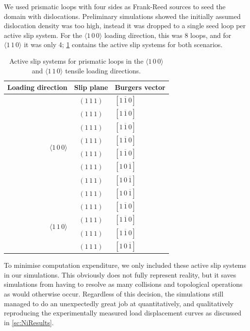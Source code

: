 We used prismatic loops with four sides as Frank-Reed sources to seed the domain with dislocations. Preliminary simulations showed the initially assumed dislocation density was too high, instead it was dropped to a single seed loop per active slip system. For the $\langle 1\, 0\, 0 \rangle$ loading direction, this was 8 loops, and for $\langle 1\, 1\, 0 \rangle$ it was only 4; \cref{t:slipSystems} contains the active slip systems for both scenarios.
\begin{table}
    \centering
    \caption{Active slip systems for prismatic loops in the $\langle 1\, 0\, 0 \rangle$ and $\langle 1\, 1\, 0 \rangle$ tensile loading directions.}
    \label{t:slipSystems}
    \begin{tabular}{rcl}
        \toprule
        Loading direction                            & Slip plane    & Burgers vector           \\
        \midrule
        \multirow{8}{*}{$\langle 1\, 0\, 0 \rangle$} & $(1\, 1\, 1)$ & $[1\, \overline{1}\, 0]$ \\
                                                     & $(1\, 1\, 1)$ & $[1\, \overline{1}\, 0]$ \\
                                                     & $(1\, 1\, 1)$ & $[1\, \overline{1}\, 0]$ \\
                                                     & $(1\, 1\, 1)$ & $[1\, \overline{1}\, 0]$ \\
                                                     & $(1\, 1\, 1)$ & $[1\, \overline{1}\, 0]$ \\
                                                     & $(1\, 1\, 1)$ & $[1\, 0\, \overline{1}]$ \\
                                                     & $(1\, 1\, 1)$ & $[1\, 0\, \overline{1}]$ \\
                                                     & $(1\, 1\, 1)$ & $[1\, 0\, \overline{1}]$ \\
        \midrule
        \multirow{4}{*}{$\langle 1\, 1\, 0 \rangle$} & $(1\, 1\, 1)$ & $[1\, \overline{1}\, 0]$ \\
                                                     & $(1\, 1\, 1)$ & $[1\, \overline{1}\, 0]$ \\
                                                     & $(1\, 1\, 1)$ & $[1\, \overline{1}\, 0]$ \\
                                                     & $(1\, 1\, 1)$ & $[1\, 0\, \overline{1}]$ \\
        \bottomrule
    \end{tabular}
\end{table}
To minimise computation expenditure, we only included these active slip systems in our simulations. This obviously does not fully represent reality, but it saves simulations from having to resolve as many collisions and topological operations as would otherwise occur. Regardless of this decision, the simulations still managed to do an unexpectedly great job at quantitatively, and qualitatively reproducing the experimentally measured load displacement curves as discussed in \cref{sc:NiResults}.

